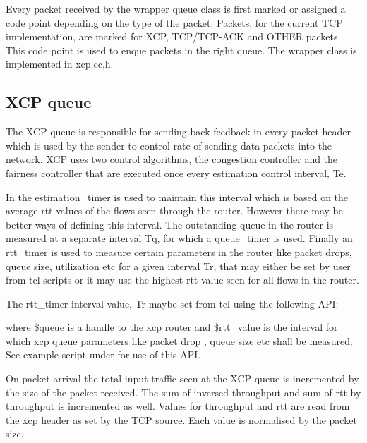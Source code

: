     Every packet received by the wrapper queue class is first marked or
    assigned a code point depending on the type of the packet. Packets,
    for the current TCP implementation, are marked for XCP, TCP/TCP-ACK
    and OTHER packets. This code point is used to enque packets in the right
    queue. The wrapper class is implemented in xcp.{cc,h}.
    
    
    \subsection{XCP queue}
    \label{sec:xcp_queue}

    The XCP queue is responsible for sending back feedback in every packet
    header which is used by the sender to control rate of sending data
    packets into the network. XCP uses two control algorithms, the
    congestion controller and the fairness controller that are executed
    once every estimation control interval, Te. 

    In \ns{}  the
    estimation\_timer is used to maintain this interval which is based on
    the average rtt values of the flows seen through the router. However
    there may be better ways of defining this interval. The outstanding
    queue in the router is measured at a separate interval Tq, for which a
    queue\_timer is used. Finally an rtt\_timer is used to measure certain
    parameters in the router like packet drops, queue size, utilization 
    etc for a given interval Tr, that may either be set by user from tcl
    scripts or it may use the highest rtt value seen for all flows in the
    router. 

    The rtt\_timer interval value, Tr maybe set from tcl using the
    following API: 
    
    
    where \$queue is a handle to the xcp router and \$rtt\_value is the
    interval for which xcp queue parameters like packet drop , queue size etc
    shall be measured. See example script under
     for use of
    this API.
    
    On packet arrival the total input traffic seen at the XCP queue is
    incremented by the size of the packet received. The sum of inversed
    throughput and sum of rtt by throughput is incremented as
    well. Values for throughput and rtt are read from the xcp header as
    set by the TCP source. Each value is normalised by the packet size.
    
